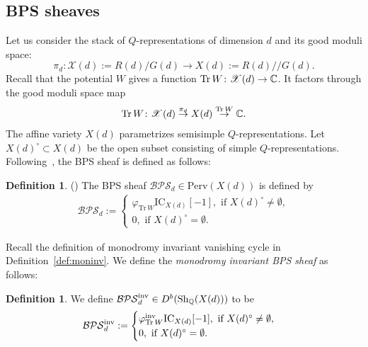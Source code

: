\documentclass [11pt,oneside,a4paper,mathscr]{amsart}
\theoremstyle{definition}
\newtheorem{defn}[thm]{Definition}
\newcommand{\X}{\mathscr{X}}
\newcommand{\Tr}{\mathop{\rm Tr}}
\newcommand{\ssslash}{/\!\!/}
\begin{document}
\subsection{BPS sheaves}\label{sub613}
Let us consider the stack of $Q$-representations of 
dimension $d$ and its good moduli space:
\[\pi_d\colon \X(d):=R(d)/G(d)\to X(d):=R(d)\ssslash G(d).\]
Recall that the potential $W$ gives a 
function $\Tr W \colon \X(d) \to \mathbb{C}$. 
It factors through the good moduli space map
\begin{align*}
\Tr W \colon \X(d) \stackrel{\pi_d}{\to} X(d) \stackrel{\Tr W}{\to} \mathbb{C}. 
\end{align*}
The affine variety $X(d)$ parametrizes 
semisimple $Q$-representations. 
Let $X(d)^{\circ} \subset X(d)$ 
be the open subset consisting of 
simple $Q$-representations. 
Following~\cite{DM}, the BPS sheaf
is defined as follows: 
\begin{defn}(\cite{DM})
The BPS sheaf $\mathcal{BPS}_d\in \mathrm{Perv}(X(d))$ is defined by 
\begin{align*}\mathcal{BPS}_d:=\begin{cases}
     \varphi_{\mathrm{Tr}\,W} \mathrm{IC}_{X(d)}[-1],\text{ if }X(d)^{\circ}\neq \emptyset,\\
     0,\text{ if }X(d)^{\circ}=\emptyset.
 \end{cases}
 \end{align*}
 \end{defn}
Recall the definition of monodromy invariant 
vanishing cycle in Definition~\ref{def:moninv}. 
We define the \textit{monodromy invariant BPS sheaf}
as follows: 
\begin{defn}
We define $\mathcal{BPS}_d^{\rm{inv}} \in D^b(\mathrm{Sh}_{\mathbb{Q}}(X(d)))$ to be 
\begin{align*}\mathcal{BPS}_d^{\rm{inv}}:=\begin{cases}
     \varphi^{\rm{inv}}_{\mathrm{Tr}\,W} \mathrm{IC}_{X(d)}[-1],\text{ if }X(d)^{\circ}\neq \emptyset,\\
     0,\text{ if }X(d)^{\circ}=\emptyset.
 \end{cases}
 \end{align*}

\end{defn}







\end{document}
